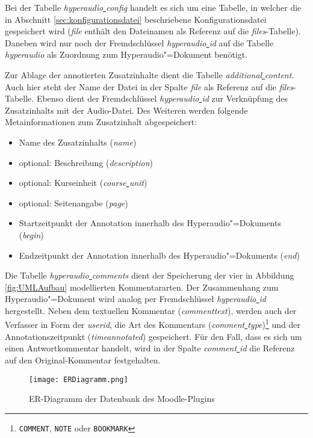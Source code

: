 Bei der Tabelle \textit{hyperaudio\underline{{ }}config} handelt es sich um eine Tabelle, in welcher die in Abschnitt \ref{sec:konfigurationsdatei} beschriebene Konfigurationsdatei gespeichert wird (\textit{file} enthält den Dateinamen als Referenz auf die \textit{files}-Tabelle). Daneben wird nur noch der Fremdschlüssel \textit{hyperaudio\underline{{ }}id} auf die Tabelle \textit{hyperaudio} als Zuordnung zum Hyperaudio"=Dokument benötigt.

Zur Ablage der annotierten Zusatzinhalte dient die Tabelle \textit{additional\underline{{ }}content}. Auch hier steht der Name der Datei in der Spalte \textit{file} als Referenz auf die \textit{files}-Tabelle. Ebenso dient der Fremdschlüssel \textit{hyperaudio\underline{{ }}id} zur Verknüpfung des Zusatzinhalts mit der Audio-Datei. Des Weiteren werden folgende Metainformationen zum Zusatzinhalt abgespeichert:

\begin{itemize}

\item Name des Zusatzinhalts (\textit{name})
\item optional: Beschreibung (\textit{description})
\item optional: Kurseinheit (\textit{course\underline{{ }}unit})
\item optional: Seitenangabe (\textit{page})
\item Startzeitpunkt der Annotation innerhalb des Hyperaudio"=Dokuments (\textit{begin})
\item Endzeitpunkt der Annotation innerhalb des Hyperaudio"=Dokuments (\textit{end})

\end{itemize}

Die Tabelle \textit{hyperaudio\underline{{ }}comments} dient der Speicherung der vier in Abbildung \ref{fig:UMLAufbau} modellierten Kommentararten. Der Zusammenhang zum Hyperaudio"=Dokument wird analog per Fremdschlüssel \textit{hyperaudio\underline{{ }}id} hergestellt. Neben dem textuellen Kommentar (\textit{commenttext}), werden auch der Verfasser in Form der \textit{userid}, die Art des Kommentars (\textit{comment\underline{{ }}type})\footnote{\texttt{COMMENT}, \texttt{NOTE} oder \texttt{BOOKMARK}} und der Annotationszeitpunkt (\textit{timeannotated}) gespeichert. Für den Fall, dass es sich um einen Antwortkommentar handelt, wird in der Spalte \textit{comment\underline{{ }}id} die Referenz auf den Original-Kommentar festgehalten.

\begin{figure}[h!]
\texttt{[image: ERDiagramm.png]}
\caption{\label{fig:ERDiagramm}ER-Diagramm der Datenbank des Moodle-Plugins}
\end{figure}


